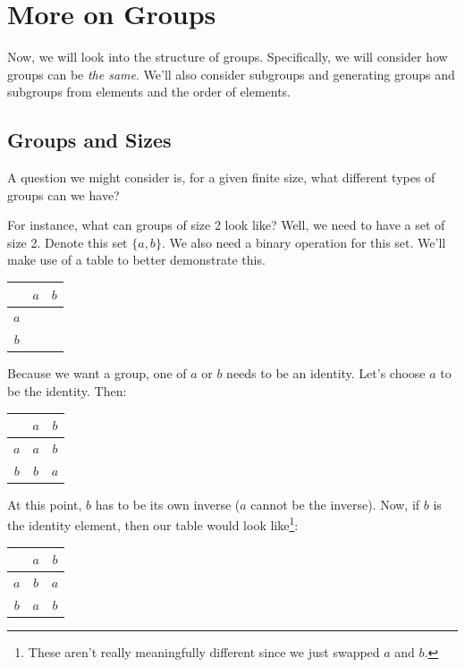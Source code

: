 \documentclass[letterpaper]{article}
\begin{document}
\newpage 
\section{More on Groups}
Now, we will look into the structure of groups. Specifically, we will consider how groups can be \emph{the same}. We'll also consider subgroups and generating groups and subgroups from elements and the order of elements. 

\subsection{Groups and Sizes}
A question we might consider is, for a given finite size, what different types of groups can we have?

\bigskip 

For instance, what can groups of size 2 look like? Well, we need to have a set of size 2. Denote this set $\{a, b\}$. We also need a binary operation for this set. We'll make use of a table to better demonstrate this.
\begin{center}
    \begin{tabular}{c|c c}
            & $a$ & $b$ \\ 
        \hline 
        $a$ &     &     \\ 
        $b$ &     &     
    \end{tabular}
\end{center}
Because we want a group, one of $a$ or $b$ needs to be an identity. Let's choose $a$ to be the identity. Then:
\begin{center}
    \begin{tabular}{c|c c}
            & $a$ & $b$ \\ 
        \hline 
        $a$ & $a$ & $b$ \\ 
        $b$ & $b$ & $a$ 
    \end{tabular}
\end{center}
At this point, $b$ has to be its own inverse ($a$ cannot be the inverse). Now, if $b$ is the identity element, then our table would look like\footnote{These aren't really meaningfully different since we just swapped $a$ and $b$.}:
\begin{center}
    \begin{tabular}{c|c c}
            & $a$ & $b$ \\ 
        \hline 
        $a$ & $b$ & $a$ \\ 
        $b$ & $a$ & $b$ 
    \end{tabular}
\end{center}
\end{document}
